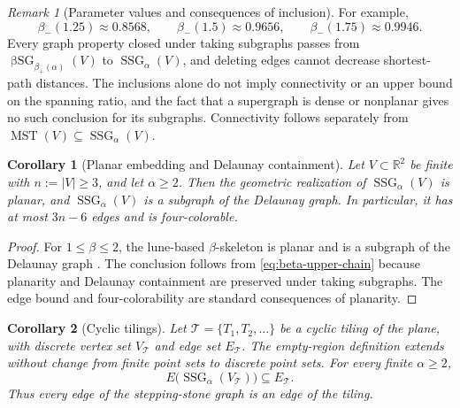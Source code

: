 \documentclass[a4paper,fleqn]{cas-sc}
\newtheorem{corollary}{Corollary}
\theoremstyle{definition}
\theoremstyle{remark}
\newtheorem{remark}{Remark}
\newcommand{\R}{\mathds{R}}
\newcommand{\0}{\mathbf{0}}
\DeclareMathOperator{\SSG}{SSG}
\DeclareMathOperator{\BSG}{\beta SG}
\DeclareMathOperator{\MST}{MST}
\begin{document}
\begin{remark}[Parameter values and consequences of inclusion]
For example,
\begin{equation}
    \beta_-(1.25)\approx0.8568,
    \qquad
    \beta_-(1.5)\approx0.9656,
    \qquad
    \beta_-(1.75)\approx0.9946.
\end{equation}
Every graph property closed under taking subgraphs passes from
$\BSG_{\beta_+(\alpha)}(V)$ to $\SSG_\alpha(V)$, and deleting edges cannot
decrease shortest-path distances.  The inclusions alone do not imply
connectivity or an upper bound on the spanning ratio, and the fact that a
supergraph is dense or nonplanar gives no such conclusion for its
subgraphs.  Connectivity follows separately from
$\MST(V)\subseteq\SSG_\alpha(V)$.
\end{remark}

\begin{corollary}[Planar embedding and Delaunay containment]
\label{cor:beta-planar-structure}
Let $V\subset\R^2$ be finite with $n:=|V|\geq3$, and let
$\alpha\geq2$.  Then the geometric realization of
$\SSG_\alpha(V)$ is planar, and $\SSG_\alpha(V)$ is a subgraph of the
Delaunay graph.  In particular, it has at most $3n-6$ edges and is
four-colorable.
\end{corollary}

\begin{proof}
For $1\leq\beta\leq2$, the lune-based $\beta$-skeleton is planar and is a
subgraph of the Delaunay graph
\citep{jaromczyk1992relative,maravillo2023cyclic}.  The conclusion follows
from \eqref{eq:beta-upper-chain} because planarity and Delaunay containment
are preserved under taking subgraphs.  The edge bound and four-colorability
are standard consequences of planarity.
\end{proof}

\begin{corollary}[Cyclic tilings]
\label{cor:cyclic-tiling}
Let $\mathcal T=\{T_1,T_2,\ldots\}$ be a cyclic tiling of the plane, with
discrete vertex set $V_{\mathcal T}$ and edge set $E_{\mathcal T}$.  The
empty-region definition extends without change from finite point sets to
discrete point sets.  For every finite $\alpha\geq2$,
\begin{equation}
    E\bigl(\SSG_\alpha(V_{\mathcal T})\bigr)
    \subseteq E_{\mathcal T}.
\end{equation}
Thus every edge of the stepping-stone graph is an edge of the tiling.
\end{corollary}
\end{document}
